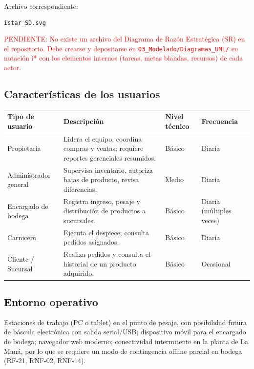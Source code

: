 \documentclass[11pt,a4paper]{article}
\begin{document}
\noindent Archivo correspondiente:
\begin{verbatim}
istar_SD.svg
\end{verbatim}

\noindent\textcolor{red}{PENDIENTE: No existe un archivo del Diagrama de Razón Estratégica (SR) en el repositorio. Debe crearse y depositarse en \texttt{03\_Modelado/Diagramas\_UML/} en notación i* con los elementos internos (tareas, metas blandas, recursos) de cada actor.}

\subsection{Características de los usuarios}
\begin{longtable}{|p{2.8cm}|p{5cm}|p{2cm}|p{2.5cm}|}
\hline
\textbf{Tipo de usuario} & \textbf{Descripción} & \textbf{Nivel técnico} & \textbf{Frecuencia} \\
\hline
Propietaria & Lidera el equipo, coordina compras y ventas; requiere reportes gerenciales resumidos. & Básico & Diaria \\
\hline
Administrador general & Supervisa inventario, autoriza bajas de producto, revisa diferencias. & Medio & Diaria \\
\hline
Encargado de bodega & Registra ingreso, pesaje y distribución de productos a sucursales. & Básico & Diaria (múltiples veces) \\
\hline
Carnicero & Ejecuta el despiece; consulta pedidos asignados. & Básico & Diaria \\
\hline
Cliente / Sucursal & Realiza pedidos y consulta el historial de un producto adquirido. & Básico & Ocasional \\
\hline
\end{longtable}

\subsection{Entorno operativo}
Estaciones de trabajo (PC o tablet) en el punto de pesaje, con posibilidad futura de báscula electrónica con salida serial/USB; dispositivo móvil para el encargado de bodega; navegador web moderno; conectividad intermitente en la planta de La Maná, por lo que se requiere un modo de contingencia offline parcial en bodega (RF-21, RNF-02, RNF-14).
\end{document}
